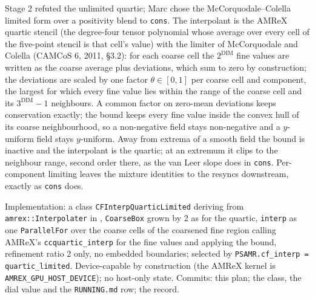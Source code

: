 \documentclass[11pt,a4paper]{article}
\newcommand{\code}[1]{\texttt{\small #1}}
\begin{document}
Stage 2 refuted the unlimited quartic; Marc chose the McCorquodale--Colella
limited form over a positivity blend to \code{cons}.  The interpolant is
the AMReX quartic stencil (the degree-four tensor polynomial whose average
over every cell of the five-point stencil is that cell's value) with the
limiter of McCorquodale and Colella (CAMCoS 6, 2011, \S3.2): for each
coarse cell the $2^{\mathrm{DIM}}$ fine values are written as the coarse
average plus deviations, which sum to zero by construction; the
deviations are scaled by one factor $\theta\in[0,1]$ per coarse cell and
component, the largest for which every fine value lies within the range of
the coarse cell and its $3^{\mathrm{DIM}}-1$ neighbours.  A common factor
on zero-mean deviations keeps conservation exactly; the bound keeps every
fine value inside the convex hull of its coarse neighbourhood, so a
non-negative field stays non-negative and a $y$-uniform field stays
$y$-uniform.  Away from extrema of a smooth field the bound is inactive
and the interpolant is the quartic; at an extremum it clips to the
neighbour range, second order there, as the van Leer slope does in
\code{cons}.  Per-component limiting leaves the mixture identities to the
resyncs downstream, exactly as \code{cons} does.

Implementation: a class \code{CFInterpQuarticLimited} deriving from
\code{amrex::Interpolater} in ,
\code{CoarseBox} grown by 2 as for the quartic, \code{interp} as one
\code{ParallelFor} over the coarse cells of the coarsened fine region
calling AMReX's \code{ccquartic\_interp} for the fine values and applying
the bound, refinement ratio 2 only, no embedded boundaries; selected by
\code{PSAMR.cf\_interp = quartic\_limited}.  Device-capable by
construction (the AMReX kernel is \code{AMREX\_GPU\_HOST\_DEVICE}); no
host-only state.  Commits: this plan; the class, the dial value and the
\code{RUNNING.md} row; the record.
\end{document}
